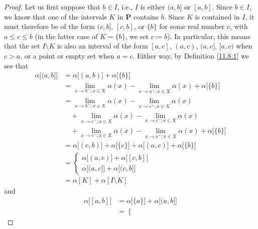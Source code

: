 \begin{proof}
            Let us first suppose that \(b \in I\), i.e., \(I\) is either \((a, b]\) or \([a, b]\).
    Since \(b \in I\), we know that one of the intervals \(K\) in \(\mathbf{P}\) contains \(b\).
    Since \(K\) is contained in \(I\), it must therefore be of the form \((c, b]\), \([c, b]\), or \(\{b\}\) for some real number \(c\), with \(a \leq c \leq b\) (in the latter case of \(K = \{b\}\), we set \(c \coloneqq b\)).
    In particular, this means that the set \(I \setminus K\) is also an interval of the form \([a, c]\), \((a, c)\), \((a, c]\), \([a, c)\) when \(c > a\), or a point or empty set when \(a = c\).
    Either way, by Definition \ref{11.8.1} we see that
    \begin{align*}
        \alpha\big[(a, b]\big] & = \alpha\big[(a, b)\big] + \alpha\big[\{b\}\big]                                                            \\
                               & = \lim_{x \to b^- ; x \in X} \alpha(x) - \lim_{x \to a^+ ; x \in X} \alpha(x) + \alpha\big[\{b\}\big]       \\
                               & = \lim_{x \to b^- ; x \in X} \alpha(x) - \lim_{x \to c^+ ; x \in X} \alpha(x)                               \\
                               & \quad + \lim_{x \to c^+ ; x \in X} \alpha(x) - \lim_{x \to c^- ; x \in X} \alpha(x)                         \\
                               & \quad + \lim_{x \to c^- ; x \in X} \alpha(x) - \lim_{x \to a^+ ; x \in X} \alpha(x) + \alpha\big[\{b\}\big] \\
                               & = \alpha\big[(c, b)\big] + \alpha\big[\{c\}\big] + \alpha\big[(a, c)\big] + \alpha\big[\{b\}\big]           \\
                               & = \begin{cases}
            \alpha\big[(a, c)\big] + \alpha\big[[c, b]\big] \\
            \alpha\big[(a, c]\big] + \alpha\big[(c, b]\big]
        \end{cases}                                                                                 \\
                               & = \alpha[K] + \alpha[I \setminus K]
    \end{align*}
    and
    \begin{align*}
        \alpha\big[[a, b]\big] & = \alpha\big[\{a\}\big] + \alpha\big[(a, b]\big] \\
                               & = \begin{cases}

\end{cases}
\end{align*}
\end{proof}
